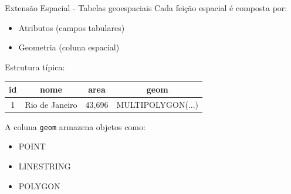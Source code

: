 \documentclass{beamer}
\begin{document}
\begin{frame}{Extensão Espacial - Tabelas geoespaciais}
    Cada feição espacial é composta por:
    
    \begin{itemize}
        \item Atributos (campos tabulares)
        \item Geometria (coluna espacial)
    \end{itemize}
    
    \vspace{0.4cm}
    
    Estrutura típica:
    
    \begin{center}
\begin{table}
\centering
\scriptsize
\begin{tabular}{|c|c|c|c|}
\hline
\textbf{id} & \textbf{nome} & \textbf{area} & \textbf{geom} \\
\hline
1 & Rio de Janeiro & 43,696 & MULTIPOLYGON(...) \\
\hline
\end{tabular}
\end{table}
    \end{center}
    
    \vspace{0.4cm}
    
    A coluna \texttt{geom} armazena objetos como:
    
    \begin{itemize}
        \item POINT
        \item LINESTRING
        \item POLYGON
    \end{itemize}
\end{frame}
\end{document}
